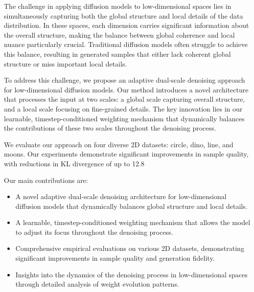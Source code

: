 \documentclass{article} %
\begin{document}
The challenge in applying diffusion models to low-dimensional spaces lies in simultaneously capturing both the global structure and local details of the data distribution. In these spaces, each dimension carries significant information about the overall structure, making the balance between global coherence and local nuance particularly crucial. Traditional diffusion models often struggle to achieve this balance, resulting in generated samples that either lack coherent global structure or miss important local details.

To address this challenge, we propose an adaptive dual-scale denoising approach for low-dimensional diffusion models. Our method introduces a novel architecture that processes the input at two scales: a global scale capturing overall structure, and a local scale focusing on fine-grained details. The key innovation lies in our learnable, timestep-conditioned weighting mechanism that dynamically balances the contributions of these two scales throughout the denoising process.

We evaluate our approach on four diverse 2D datasets: circle, dino, line, and moons. Our experiments demonstrate significant improvements in sample quality, with reductions in KL divergence of up to 12.8%

Our main contributions are:
\begin{itemize}
    \item A novel adaptive dual-scale denoising architecture for low-dimensional diffusion models that dynamically balances global structure and local details.
    \item A learnable, timestep-conditioned weighting mechanism that allows the model to adjust its focus throughout the denoising process.
    \item Comprehensive empirical evaluations on various 2D datasets, demonstrating significant improvements in sample quality and generation fidelity.
    \item Insights into the dynamics of the denoising process in low-dimensional spaces through detailed analysis of weight evolution patterns.
\end{itemize}
\end{document}
